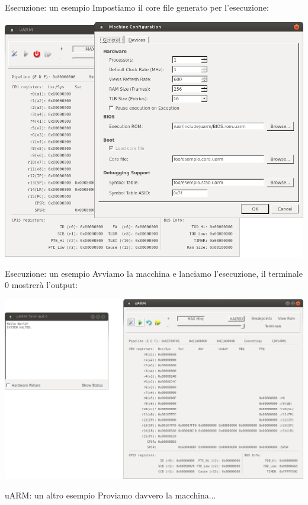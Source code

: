 \documentclass{beamer}
\begin{document}
\begin{frame}{Esecuzione: un esempio}
Impostiamo il core file generato per l'esecuzione:
\newline

\centering
\includegraphics[height=0.75\textheight]{img/esempio_config.png}
\end{frame}

\begin{frame}{Esecuzione: un esempio}
Avviamo la macchina e lanciamo l'esecuzione, il terminale 0 mostrerà l'output:

\centering
\includegraphics[height=0.75\textheight]{img/esempio_exec.png}
\end{frame}

\begin{frame}{uARM: un altro esempio}
\Large Proviamo davvero la macchina...
\end{frame}
\end{document}
